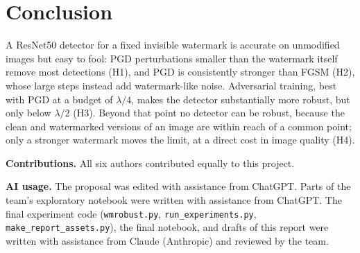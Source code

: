 \documentclass[sigconf, nonacm]{acmart}
\begin{document}
\section{Conclusion}
A ResNet50 detector for a fixed invisible watermark is accurate on unmodified images but easy to
fool: PGD perturbations smaller than the watermark itself remove most detections (H1), and PGD is
consistently stronger than FGSM (H2), whose large steps instead add watermark-like noise.
Adversarial training, best with PGD at a budget of $\lambda/4$, makes the detector substantially
more robust, but only below $\lambda/2$ (H3). Beyond that point no detector can be robust, because
the clean and watermarked versions of an image are within reach of a common point; only a stronger
watermark moves the limit, at a direct cost in image quality (H4).

\noindent\textbf{Contributions.} All six authors contributed equally to this project.

\noindent\textbf{AI usage.} The proposal was edited with assistance from ChatGPT. Parts of the
team's exploratory notebook were written with assistance from ChatGPT. The final experiment code
(\texttt{wmrobust.py}, \texttt{run\_experiments.py}, \texttt{make\_report\_assets.py}), the final
notebook, and drafts of this report were written with assistance from Claude (Anthropic) and
reviewed by the team.

\nocite{*}


\end{document}
